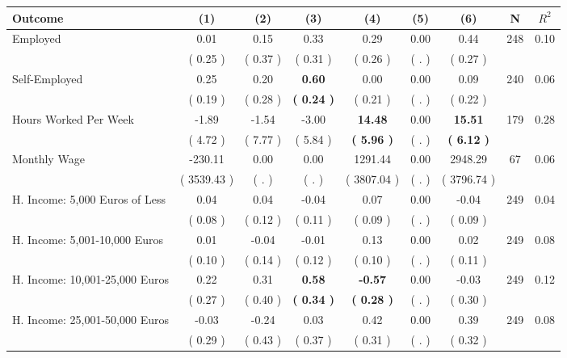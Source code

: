 \begin{tabular}{lcccccccc}
\toprule
 \textbf{Outcome} & \textbf{(1)} & \textbf{(2)} & \textbf{(3)} & \textbf{(4)} & \textbf{(5)} & \textbf{(6)} & \textbf{N} & \textbf{$ R^2$} \\
\midrule
Employed &      0.01 &      0.15 &      0.33 &      0.29 &      0.00 &      0.44 & 248 &       0.10 \\ 
 & (     0.25 ) & (     0.37 ) & (     0.31 ) & (     0.26 ) & (        . ) & (     0.27 ) & \\
Self-Employed &      0.25 &      0.20 & \textbf{     0.60} &      0.00 &      0.00 &      0.09 & 240 &       0.06 \\ 
 & (     0.19 ) & (     0.28 ) & \textbf{(     0.24 )} & (     0.21 ) & (        . ) & (     0.22 ) & \\
Hours Worked Per Week &     -1.89 &     -1.54 &     -3.00 & \textbf{    14.48} &      0.00 & \textbf{    15.51} & 179 &       0.28 \\ 
 & (     4.72 ) & (     7.77 ) & (     5.84 ) & \textbf{(     5.96 )} & (        . ) & \textbf{(     6.12 )} & \\
Monthly Wage &   -230.11 &      0.00 &      0.00 &   1291.44 &      0.00 &   2948.29 & 67 &       0.06 \\ 
 & (  3539.43 ) & (        . ) & (        . ) & (  3807.04 ) & (        . ) & (  3796.74 ) & \\
H. Income: 5,000 Euros of Less &      0.04 &      0.04 &     -0.04 &      0.07 &      0.00 &     -0.04 & 249 &       0.04 \\ 
 & (     0.08 ) & (     0.12 ) & (     0.11 ) & (     0.09 ) & (        . ) & (     0.09 ) & \\
H. Income: 5,001-10,000 Euros &      0.01 &     -0.04 &     -0.01 &      0.13 &      0.00 &      0.02 & 249 &       0.08 \\ 
 & (     0.10 ) & (     0.14 ) & (     0.12 ) & (     0.10 ) & (        . ) & (     0.11 ) & \\
H. Income: 10,001-25,000 Euros &      0.22 &      0.31 & \textbf{     0.58} & \textbf{    -0.57} &      0.00 &     -0.03 & 249 &       0.12 \\ 
 & (     0.27 ) & (     0.40 ) & \textbf{(     0.34 )} & \textbf{(     0.28 )} & (        . ) & (     0.30 ) & \\
H. Income: 25,001-50,000 Euros &     -0.03 &     -0.24 &      0.03 &      0.42 &      0.00 &      0.39 & 249 &       0.08 \\ 
 & (     0.29 ) & (     0.43 ) & (     0.37 ) & (     0.31 ) & (        . ) & (     0.32 ) & \\

\end{tabular}
